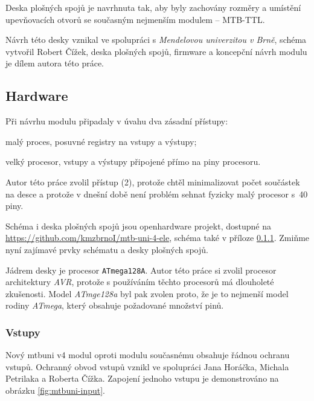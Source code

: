 Deska plošných spojů je navrhnuta tak, aby byly zachovány rozměry a umístění
upevňovacích otvorů se současným nejmenším modulem – MTB-TTL.

Návrh této desky vznikal ve spolupráci s \textit{Mendelovou univerzitou v Brně},
schéma vytvořil Robert Čížek, deska plošných spojů, firmware a koncepční návrh
modulu je dílem autora této práce.


\subsection{Hardware}

Při návrhu modulu připadaly v úvahu dva zásadní přístupy:

\begin{compactenum}
\item malý proces, posuvné registry na vstupy a výstupy;
\item velký procesor, vstupy a výstupy připojené přímo na piny procesoru.
\end{compactenum}

Autor této práce zvolil přístup (2), protože chtěl minimalizovat počet
součástek na desce a protože v dnešní době není problém sehnat fyzicky malý
procesor s~40 piny.

Schéma i deska plošných spojů jsou openhardware projekt, dostupné na
\url{https://github.com/kmzbrnoI/mtb-uni-4-ele}, schéma také v příloze
\ref{}. Zmiňme nyní zajímavé prvky schématu a desky plošných spojů.

Jádrem desky je procesor \texttt{ATmega128A}. Autor této práce si zvolil
procesor architektury \textit{AVR}, protože s používáním těchto procesorů má
dlouholeté zkušenosti. Model \textit{ATmge128a} byl pak zvolen proto, že je to
nejmenší model rodiny \textit{ATmega}, který obsahuje požadované množství pinů.

\subsubsection{Vstupy}

Nový \gls{mtbuni} v4 modul oproti modulu současnému obsahuje řádnou ochranu
vstupů. Ochranný obvod vstupů vznikl ve spolupráci Jana Horáčka, Michala
Petrilaka a Roberta Čížka. Zapojení jednoho vstupu je demonstrováno na obrázku
\ref{fig:mtbuni-input}.

